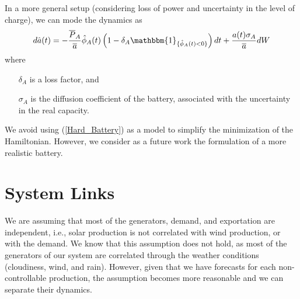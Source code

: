 In a more general setup (considering loss of power and uncertainty in the level of charge), we can mode the dynamics as
\begin{equation*}
d\hat{a}(t)=-\frac{\overline{P}_A}{\overline{a}}\hat{\phi}_A(t)\left(1-\delta_A\mathbbm{1}_{\{\hat{\phi}_A(t)<0\}}\right)dt+\frac{a(t)\sigma_A}{\overline{a}}dW
\label{Hard_Battery}
\end{equation*}
where
\begin{enumerate}

\item[$\delta_A$] is a loss factor, and

\item[$\sigma_A$] is the diffusion coefficient of the battery, associated with the uncertainty in the real capacity.

\end{enumerate}
We avoid using (\ref{Hard_Battery}) as a model to simplify the minimization of the Hamiltonian. However, we consider as a future work the formulation of a more realistic battery.

%

\section{System Links}

We are assuming that most of the generators, demand, and exportation are independent, i.e., solar production is not correlated with wind production, or with the demand. We know that this assumption does not hold, as most of the generators of our system are correlated through the weather conditions (cloudiness, wind, and rain). However, given that we have forecasts for each non-controllable production, the assumption becomes more reasonable and we can separate their dynamics.

